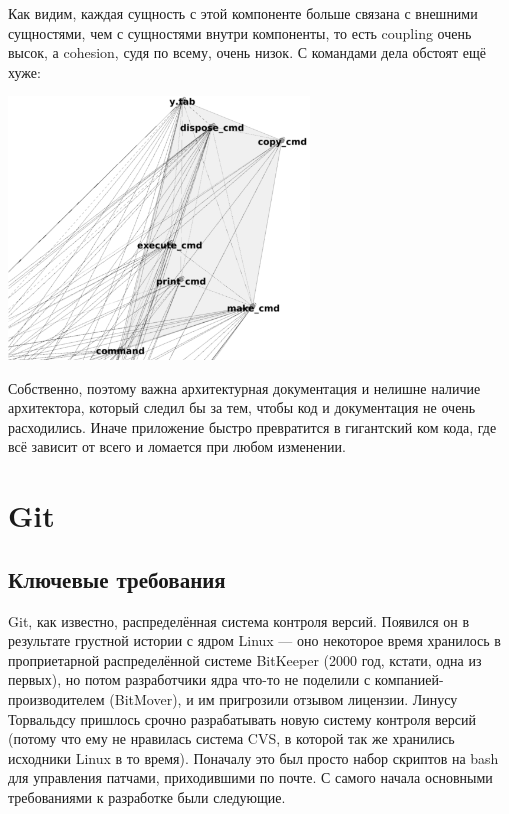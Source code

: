 \documentclass{../text-style}
\begin{document}
Как видим, каждая сущность с этой компоненте больше связана с внешними сущностями, чем с сущностями внутри компоненты, то есть coupling очень высок, а cohesion, судя по всему, очень низок. С командами дела обстоят ещё хуже:

\begin{center}
    \includegraphics[width=0.6\textwidth]{bashCommands.png}
\end{center}

Собственно, поэтому важна архитектурная документация и нелишне наличие архитектора, который следил бы за тем, чтобы код и документация не очень расходились. Иначе приложение быстро превратится в гигантский ком кода, где всё зависит от всего и ломается при любом изменении.

\section{Git}

\subsection{Ключевые требования}

Git, как известно, распределённая система контроля версий. Появился он в результате грустной истории с ядром Linux --- оно некоторое время хранилось в проприетарной распределённой системе BitKeeper (2000 год, кстати, одна из первых), но потом разработчики ядра что-то не поделили с компанией-производителем (BitMover), и им пригрозили отзывом лицензии. Линусу Торвальдсу пришлось срочно разрабатывать новую систему контроля версий (потому что ему не нравилась система CVS, в которой так же хранились исходники Linux в то время). Поначалу это был просто набор скриптов на bash для управления патчами, приходившими по почте. С самого начала основными требованиями к разработке были следующие.
\end{document}
